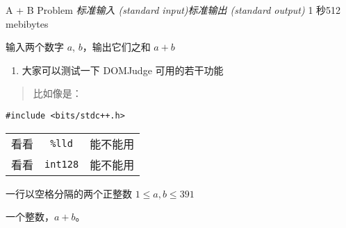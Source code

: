 \begin{problem}{A + B Problem}
{\textsl{标准输入 (standard input)}}{\textsl{标准输出 (standard output)}}
{1 秒}{512 mebibytes}{}

输入两个数字 $a$, $b$，输出它们之和 $a + b$

\begin{enumerate}
    \item 大家可以测试一下 DOMJudge 可用的若干功能
\end{enumerate}

\begin{quotation}
比如像是：
\end{quotation}

\begin{verbatim}
#include <bits/stdc++.h>
\end{verbatim}

\begin{tabular}{ l | c | r }
  \hline            
  看看 & \texttt{\%lld} & 能不能用 \\
  看看 & \texttt{int128} & 能不能用 \\
  \hline  
\end{tabular}

\InputFile

一行以空格分隔的两个正整数 $1 \le a, b \le 391$

\OutputFile

一个整数，$a + b$。

\Examples

\begin{example}
%
%
\end{example}

\end{problem}
